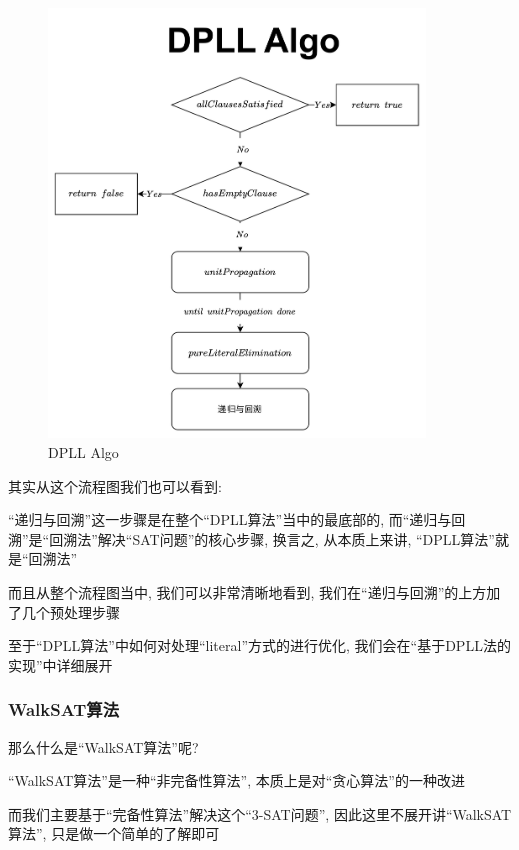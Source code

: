         \begin{figure}[H]
            \centering
            \includegraphics[width=10cm]{Figure/Figure_3.pdf}
            \caption{DPLL Algo}
        \end{figure}
        \noindent
        其实从这个流程图我们也可以看到:
        \par
        ``递归与回溯''这一步骤是在整个``DPLL算法''当中的最底部的,
        而``递归与回溯''是``回溯法''解决``SAT问题''的核心步骤,
        换言之,
        从本质上来讲,
        ``DPLL算法''就是``回溯法''
        \par
        而且从整个流程图当中,
        我们可以非常清晰地看到,
        我们在``递归与回溯''的上方加了几个预处理步骤
        \par
        至于``DPLL算法''中如何对处理``literal''方式的进行优化,
        我们会在``基于DPLL法的实现''中详细展开
        \subsubsection{WalkSAT算法}
            那么什么是``WalkSAT算法''呢?\par
            ``WalkSAT算法''是一种``非完备性算法'',
            本质上是对``贪心算法''的一种改进\par
            而我们主要基于``完备性算法''解决这个``3-SAT问题'',
            因此这里不展开讲``WalkSAT算法'',
            只是做一个简单的了解即可